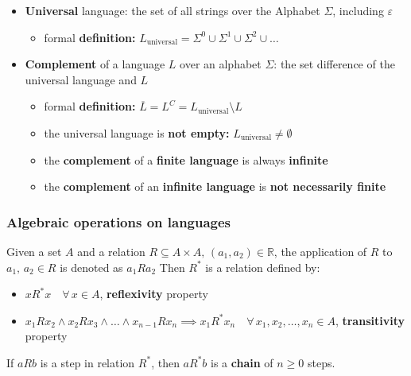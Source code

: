\documentclass[english]{article}
\begin{document}
\begin{itemize}
  \item \textbf{Universal} language: the set of all strings over the Alphabet \(\Sigma\), including \(\varepsilon\)
        \begin{itemize}
          \item formal \textbf{definition:} \(L_{\text{universal}} = \Sigma^0 \cup \Sigma^1 \cup \Sigma^2 \cup \ldots\)
        \end{itemize}
  \item \textbf{Complement} of a language \(L\) over an alphabet \(\Sigma\): the set difference of the universal language and \(L\)
        \begin{itemize}
          \item formal \textbf{definition:} \(\overline{L} = L^C = L_{\text{universal}} \setminus L\)
          \item the universal language is \textbf{not empty:} \(L_{\text{universal}} \neq \emptyset\)
          \item the \textbf{complement} of a \textbf{finite language} is always \textbf{infinite}
          \item the \textbf{complement} of an \textbf{infinite language} is \textbf{not necessarily finite}
        \end{itemize}
\end{itemize}

\subsubsection{Algebraic operations on languages}

\begin{definition}
  Given a set \(A\) and a relation \(R \subseteq A \times A, \, (a_1, a_2) \in \mathbb{R}\),
  the application of \(R\) to \(a_1, \, a_2 \in R\) is denoted as \(a_1 R a_2\)
  Then \(R^\ast\) is a relation defined by:

  \begin{itemize}
    \item \(x R^\ast x \quad \forall \, x \in A\), \textbf{reflexivity} property
    \item \(x_1 R x_2 \land x_2 R x_3 \land \ldots \land x_{n-1} R x_n \implies x_1 R^\ast x_n \quad \forall \, x_1, x_2, \ldots, x_n \in A\), \textbf{transitivity} property
  \end{itemize}

  If \(a R b\) is a step in relation \(R^\ast\), then \(a R^\ast b\) is a \textbf{chain} of \(n \geq 0\) steps.
\end{definition}
\end{document}
